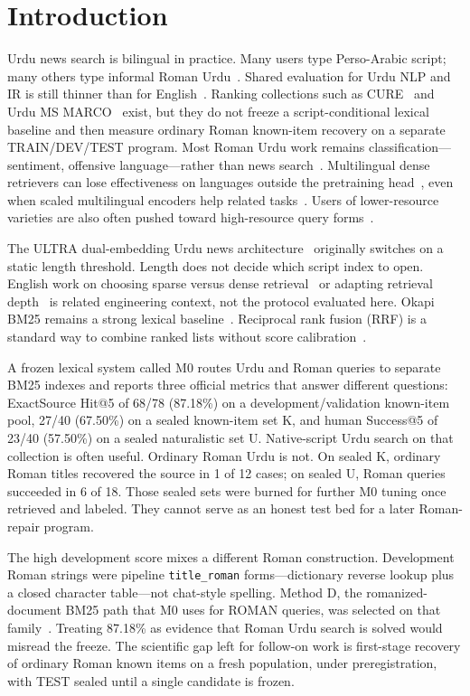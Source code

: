 \documentclass[10pt,letterpaper]{article}
\begin{document}
\clearpage
{}
\linenumbers

\section*{Introduction}
Urdu news search is bilingual in practice. Many users type Perso-Arabic script; many others type informal Roman Urdu~\cite{bib1,bib2,bib3}. Shared evaluation for Urdu NLP and IR is still thinner than for English~\cite{bib4}. Ranking collections such as CURE~\cite{bib5} and Urdu MS MARCO~\cite{bib6} exist, but they do not freeze a script-conditional lexical baseline and then measure ordinary Roman known-item recovery on a separate TRAIN/DEV/TEST program. Most Roman Urdu work remains classification---sentiment, offensive language---rather than news search~\cite{bib1,bib2}. Multilingual dense retrievers can lose effectiveness on languages outside the pretraining head~\cite{bib7}, even when scaled multilingual encoders help related tasks~\cite{bib8}. Users of lower-resource varieties are also often pushed toward high-resource query forms~\cite{bib9}.

The ULTRA dual-embedding Urdu news architecture~\cite{bib10} originally switches on a static length threshold. Length does not decide which script index to open. English work on choosing sparse versus dense retrieval~\cite{bib11} or adapting retrieval depth~\cite{bib12} is related engineering context, not the protocol evaluated here. Okapi BM25 remains a strong lexical baseline~\cite{bib13}. Reciprocal rank fusion (RRF) is a standard way to combine ranked lists without score calibration~\cite{bib15}.

A frozen lexical system called M0 routes Urdu and Roman queries to separate BM25 indexes and reports three official metrics that answer different questions: ExactSource Hit@5 of 68/78 (87.18\%) on a development/validation known-item pool, 27/40 (67.50\%) on a sealed known-item set K, and human Success@5 of 23/40 (57.50\%) on a sealed naturalistic set U. Native-script Urdu search on that collection is often useful. Ordinary Roman Urdu is not. On sealed K, ordinary Roman titles recovered the source in 1 of 12 cases; on sealed U, Roman queries succeeded in 6 of 18. Those sealed sets were burned for further M0 tuning once retrieved and labeled. They cannot serve as an honest test bed for a later Roman-repair program.

The high development score mixes a different Roman construction. Development Roman strings were pipeline \texttt{title\_roman} forms---dictionary reverse lookup plus a closed character table---not chat-style spelling. Method D, the romanized-document BM25 path that M0 uses for ROMAN queries, was selected on that family~\cite{bib13}. Treating 87.18\% as evidence that Roman Urdu search is solved would misread the freeze. The scientific gap left for follow-on work is first-stage recovery of ordinary Roman known items on a fresh population, under preregistration, with TEST sealed until a single candidate is frozen.
\end{document}
